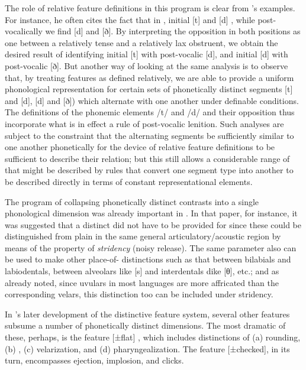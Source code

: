The role of relative feature definitions in this program is clear from
{\Jakobson}'s examples. For instance, he often cites the fact that in
, initial [t] and [d] , while post-vocalically we find
[d] and [ð]. By interpreting the opposition in both positions as one
between a relatively tense and a relatively lax obstruent, we obtain
the desired result of identifying initial [t] with post-vocalic [d],
and initial [d] with post-vocalic [ð]. But another way of looking at
the same analysis is to observe that, by treating features as defined
relatively, we are able to provide a uniform phonological
representation for certain sets of phonetically distinct segments [t]
and [d], [d] and [ð]) which alternate with one another under definable
conditions. The definitions of the phonemic elements /t/ and /d/ and
their opposition thus incorporate what is in effect a rule of
post-vocalic lenition. Such analyses are subject to the constraint that
the alternating segments be sufficiently similar to one another
phonetically for the device of relative feature definitions to be
sufficient to describe their relation; but this still allows a
considerable range of  that might be described by rules that
convert one segment type into another to be described directly in
terms of constant representational elements.

The program of collapsing phonetically distinct contrasts into a
single phonological dimension was already important in
\citet{jakobson39:classement}. In that paper, for instance, it was
suggested that a distinct  did not have to be
provided for  since these could be distinguished from plain
 in the same general articulatory/acoustic region by means of the
property of \emph{stridency} (noisy release). The same parameter also
can be used to make other place-of- distinctions such as
that between bilabials and labiodentals, between alveolars like
 [s] and interdentals dike  [θ], etc.; and as already
noted, since uvulars in most languages are more affricated than the
corresponding velars, this distinction too can be included under
stridency.

In {\Jakobson}'s later development of the distinctive feature system,
several other features subsume a number of phonetically distinct
dimensions. The most dramatic of these, perhaps, is the feature
[±flat] \citep{jakobson.fant.halle52:preliminaries}, which includes
distinctions of (a) rounding, (b) , (c) velarization, and
(d) pharyngealization. The feature [±checked], in its turn,
encompasses ejection, implosion, and clicks.

